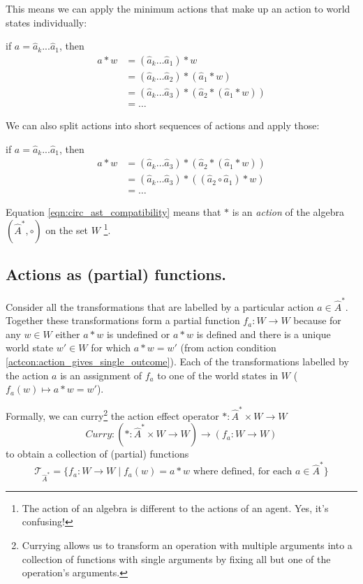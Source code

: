 This means we can apply the minimum actions that make up an action to world states individually:

if $a = \hat{a}_{k}...\hat{a}_{1}$, then
\begin{align}
	a \ast w & = (\hat{a}_{k} \dots \hat{a}_{1}) \ast w                                       \\
	         & = (\hat{a}_{k} \dots \hat{a}_{2}) \ast (\hat{a}_{1} \ast w)                    \\
	         & = (\hat{a}_{k} \dots \hat{a}_{3}) \ast (\hat{a}_{2} \ast (\hat{a}_{1} \ast w)) \\
	         & = \dots
\end{align}

We can also split actions into short sequences of actions and apply those:

if $a = \hat{a}_{k}...\hat{a}_{1}$, then
\begin{align}
	a \ast w & = (\hat{a}_{k} \dots \hat{a}_{3}) \ast (\hat{a}_{2} \ast (\hat{a}_{1} \ast w))  \\
	         & = (\hat{a}_{k} \dots \hat{a}_{3}) \ast ((\hat{a}_{2} \circ \hat{a}_{1}) \ast w) \\
	         & = \dots
\end{align}

Equation \ref{eqn:circ_ast_compatibility} means that $\ast$ is an \emph{action} of the algebra $(\hat{A}^{\ast}, \circ)$ on the set $W$ \footnote{
	The action of an algebra is different to the actions of an agent.
	Yes, it's confusing!
}.


\subsection{Actions as (partial) functions.}

Consider all the transformations that are labelled by a particular action $a \in \hat{A}^{\ast}$.
Together these transformations form a partial function $f_{a}: W \to W$ because for any $w \in W$ either $a \ast w$ is undefined or $a \ast w$ is defined and there is a unique world state $w' \in W$ for which $a \ast w = w'$ (from action condition \ref{actcon:action_gives_single_outcome}).
Each of the transformations labelled by the action $a$ is an assignment of $f_{a}$ to one of the world states in $W$ ($f_{a}(w) \mapsto a \ast w = w'$).

Formally, we can curry\footnote{Currying allows us to transform an operation with multiple arguments into a collection of functions with single arguments by fixing all but one of the operation's arguments.} the action effect operator $\ast : \hat{A}^{\ast} \times W \to W$
\begin{equation}
	\textit{Curry}: (\ast: \hat{A}^{\ast} \times W \to W) \to (f_{a}: W \to W)
\end{equation}
to obtain a collection of (partial) functions
\begin{equation}
	\mathcal{T}_{\hat{A}^{\ast}} = \{f_{a}: W \to W \mid f_{a}(w) = a \ast w \text{ where defined, for each } a \in \hat{A}^{\ast} \}
\end{equation}


